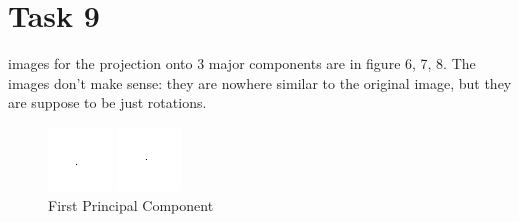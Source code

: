 \documentclass[11pt]{article}
\theoremstyle{plain}
\theoremstyle{definition}
\begin{document}
\section{Task 9}
images for the projection onto 3 major components are in figure 6, 7, 8. The images don't make sense: they are nowhere similar to the original image, but they are suppose to be just rotations. 
\begin{figure}[!htb]
   \begin{minipage}{0.48\textwidth}
     \centering
     \includegraphics[width=.7\linewidth]{Task9_1.png}
     \caption{First Principal Component}\label{Fig:First Principal Component}
   \end{minipage}\hfill
   \begin {minipage}{0.48\textwidth}
     \centering
     \includegraphics[width=.7\linewidth]{Task9_2.png}

\end{minipage}
\end{figure}
\end{document}
